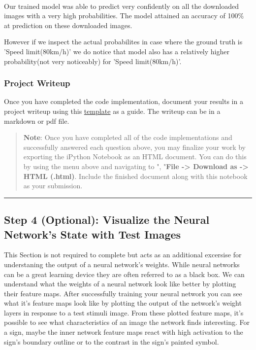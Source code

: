 \documentclass[11pt]{article}
\begin{document}
    \begin{center}
    \end{center}
    { \hspace*{\fill} \\}
    
    Our trained model was able to predict very confidently on all the
downloaded images with a very high probabilities. The model attained an
accuracy of 100\% at prediction on these downloaded images.

However if we inspect the actual probabilites in case where the ground
truth is 'Speed limit(80km/h)' we do notice that model also has a
relatively higher probability(not very noticeably) for 'Speed
limit(80km/h)'.

    \subsubsection{Project Writeup}\label{project-writeup}

Once you have completed the code implementation, document your results
in a project writeup using this
\href{https://github.com/udacity/CarND-Traffic-Sign-Classifier-Project/blob/master/writeup_template.md}{template}
as a guide. The writeup can be in a markdown or pdf file.

    \begin{quote}
\textbf{Note}: Once you have completed all of the code implementations
and successfully answered each question above, you may finalize your
work by exporting the iPython Notebook as an HTML document. You can do
this by using the menu above and navigating to \n", "\textbf{File
-\textgreater{} Download as -\textgreater{} HTML (.html)}. Include the
finished document along with this notebook as your submission.
\end{quote}

    \begin{center}\rule{0.5\linewidth}{\linethickness}\end{center}

\subsection{Step 4 (Optional): Visualize the Neural Network's State with
Test
Images}\label{step-4-optional-visualize-the-neural-networks-state-with-test-images}

This Section is not required to complete but acts as an additional
excersise for understaning the output of a neural network's weights.
While neural networks can be a great learning device they are often
referred to as a black box. We can understand what the weights of a
neural network look like better by plotting their feature maps. After
successfully training your neural network you can see what it's feature
maps look like by plotting the output of the network's weight layers in
response to a test stimuli image. From these plotted feature maps, it's
possible to see what characteristics of an image the network finds
interesting. For a sign, maybe the inner network feature maps react with
high activation to the sign's boundary outline or to the contrast in the
sign's painted symbol.
\end{document}
